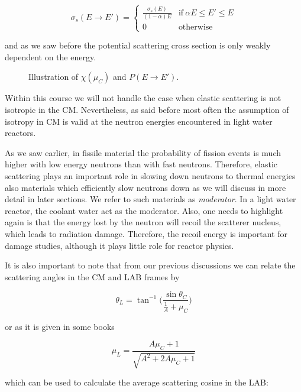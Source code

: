 \begin{equation}
    \sigma_s(E\rightarrow E') = 
    \begin{cases}
      \frac{\sigma_s(E)}{(1-\alpha)E} & \text{if} \: \alpha E \leq E' \leq E \\
      0 & \text{otherwise}
    \end{cases}
\end{equation}

\noindent and as we saw before the potential scattering cross section is only weakly dependent on the energy.

\begin{figure}[ht!]
\protect {}\protect
\caption{\label{fig:isotroppdf} \footnotesize{Illustration of $\chi(\mu_C)$ and $P(E\rightarrow E')$.}}
\end{figure}

Within this course we will not handle the case when elastic scattering is not isotropic in the CM. Nevertheless, as said before most often the assumption of isotropy in CM is valid at the neutron energies encountered in light water reactors. 

As we saw earlier, in fissile material the probability of fission events is much higher with low energy neutrons than with fast neutrons. Therefore, elastic scattering plays an important role in slowing down neutrons to thermal energies also materials which efficiently slow neutrons down as we will discuss in more detail in later sections. We refer to such materials as \textit{moderator}. In a light water reactor, the coolant water act as the moderator. Also, one needs to highlight again is that the energy lost by the neutron will recoil the scatterer nucleus, which leads to radiation damage. Therefore, the recoil energy is important for damage studies, although it plays little role for reactor physics.

It is also important to note that from our previous discussions we can relate the scattering angles in the CM and LAB frames by

$$\theta_L=\tan^{-1}\Big(\frac{\sin \theta_C}{\frac{1}{A}+\mu_C}\Big)$$

\noindent or as it is given in some books

$$\mu_L=\frac{A\mu_C+1}{\sqrt{A^2+2A\mu_C+1}}$$

\noindent which can be used to calculate the average scattering cosine in the LAB:

